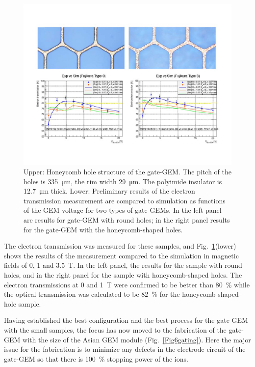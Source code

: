 \begin{figure}[htb!]
\begin{center}
\includegraphics[width=\columnwidth]{plots/TPC-Gate_Fig45gating.pdf}%
\caption{\label{Fig45gating} {Upper: Honeycomb hole structure of the gate-GEM.
The pitch of the holes is \SI{335}{\micro\meter}, the rim width \SI{29}{\micro\meter}.
The polyimide insulator is \SI{12.7}{\micro\meter} thick.
Lower: Preliminary results of the electron transmission measurement are compared to simulation
as functions of the GEM voltage for two types of gate-GEMs. In the left panel are
results for gate-GEM with round holes; in the right panel results for the gate-GEM with the honeycomb-shaped holes.}}
\end{center}
\end{figure}


The electron transmission was measured for these samples, and
Fig.~\ref{Fig45gating}(lower) shows the results of the measurement compared to the simulation in magnetic fields
of 0, 1 and \SI{3.5}{\tesla}. In the left panel, the results for the sample with round holes, and in the right panel
for the sample with honeycomb-shaped holes.  The electron transmissions at 0 and \SI{1}{\tesla} were confirmed
to be better than \SI{80}{\percent} while the optical transmission was calculated to be \SI{82}{\percent} for the honeycomb-shaped-hole sample.

Having established the best configuration and the best process for the gate GEM with the small samples,
the focus has now moved to the fabrication of the gate-GEM with  the size of the Asian GEM module (Fig.~\ref{Fig6gating}).
Here the major issue for the fabrication is to minimize any defects in the electrode circuit of the gate-GEM
so that there is \SI{100}{\percent} stopping power of the ions.

